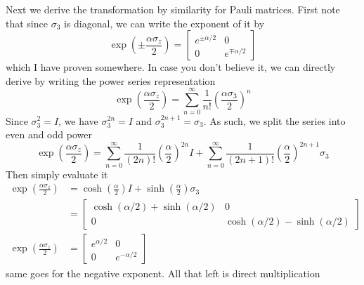 \documentclass[../../../main.tex]{subfiles}
\begin{document}
Next we derive the transformation by similarity for Pauli matrices.
First note that since $\sigma_3$ is diagonal, we can write the exponent of it by
\begin{equation*}
    \exp \left(\pm \frac{\alpha \sigma_z}{2}  \right)
    = \begin{bmatrix}
        e^{\pm\alpha/2} & 0               \\
        0               & e^{\mp\alpha/2}
    \end{bmatrix}
\end{equation*}
which I have proven somewhere.
In case you don't believe it, we can directly derive by writing the power series representation
\begin{equation*}
    \exp \left( \frac{\alpha \sigma_z}{2}  \right) = \sum_{n=0}^{\infty} \frac{1}{n!} \left( \frac{\alpha \sigma_3}{2} \right)^{n}
\end{equation*}
Since $\sigma_3^2 =I$, we have $\sigma_3^{2n} = I$ and $\sigma_3^{2n+1} = \sigma_3$.
As such, we split the series into even and odd power
\begin{equation*}
    \exp \left( \frac{\alpha \sigma_z}{2}  \right)
    = \sum_{n=0}^{\infty} \frac{1}{(2n)!} \left( \frac{\alpha}{2} \right)^{2n} I + \sum_{n=0}^{\infty} \frac{1}{(2n + 1)!} \left( \frac{\alpha}{2} \right)^{2n+1} \sigma_3
\end{equation*}
Then simply evaluate it
\begin{align*}
    \exp \left( \frac{\alpha \sigma_z}{2}  \right)
     & =  \cosh \left( \frac{\alpha }{2 }  \right) I + \sinh \left( \frac{\alpha }{2 }  \right) \sigma_3 \\
     & = \begin{bmatrix}
             \cosh(\alpha/2) + \sinh(\alpha/2) & 0                                 \\
             0                                 & \cosh(\alpha/2) - \sinh(\alpha/2)
         \end{bmatrix}                           \\
    \exp \left( \frac{\alpha \sigma_z}{2}  \right)
     & = \begin{bmatrix}
             e^{\alpha/2} & 0             \\
             0            & e^{-\alpha/2}
         \end{bmatrix}
\end{align*}
same goes for the negative exponent.
All that left is direct multiplication
\end{document}
